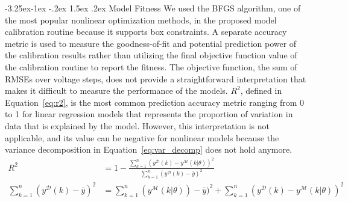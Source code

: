 \documentclass[11pt]{article}
\makeatletter
\renewcommand\subsection{\@startsection{subsection}{2}{\z@}%
                                     {-3.25ex\@plus -1ex \@minus -.2ex}%
                                     {1.5ex \@plus .2ex}%
                                     {\normalfont\fontfamily{phv}\fontsize{14}{17}\bfseries}}
\makeatother
\begin{document}
\subsection{Model Fitness}
We used the BFGS algorithm, one of the most popular nonlinear optimization methods, in the proposed model calibration routine because it supports box constraints. A separate accuracy metric is used to measure the goodness-of-fit and potential prediction power of the calibration results rather than utilizing the final objective function value of the calibration routine to report the fitness. The objective function, the sum of RMSEs over voltage steps, does not provide a straightforward interpretation that makes it difficult to measure the performance of the models. $R^{2}$, defined in Equation~\ref{eq:r2}, is the most common prediction accuracy metric ranging from 0 to 1 for linear regression models that represents the proportion of variation in data that is explained by the model. However, this interpretation is not applicable, and its value can be negative for nonlinear models because the variance decomposition in Equation~\ref{eq:var_decomp} does not hold anymore.
\begin{align}
    R^{2} &= 1 - \frac{\sum_{k=1}^{n}(y^{\mathcal{D}}(k)-y^{\mathcal{M}}(k|\theta))^2}{\sum_{k=1}^{n}(y^{\mathcal{D}}(k)-\bar{y})^2} \label{eq:r2} \\
    \sum_{k=1}^{n}(y^{\mathcal{D}}(k)-\bar{y})^2 &= \sum_{k=1}^{n}(y^{\mathcal{M}}(k|\theta))-\bar{y})^2+\sum_{k=1}^{n}(y^{\mathcal{D}}(k)-y^{\mathcal{M}}(k|\theta))^2 \label{eq:var_decomp}
\end{align}
\end{document}
